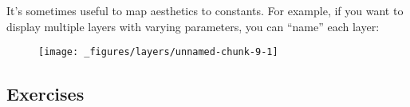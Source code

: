 It's sometimes useful to map aesthetics to constants. For example, if
you want to display multiple layers with varying parameters, you can
``name'' each layer:

\begin{Shaded}
\begin{Highlighting}[]
\OperatorTok{+}\StringTok{ }
\StringTok{  }\NormalTok{() }\OperatorTok{+}
\StringTok{  }\NormalTok{(}\NormalTok{(} \NormalTok{), } \NormalTok{, } \NormalTok{) }\OperatorTok{+}\StringTok{ }
\StringTok{  }\NormalTok{(}\NormalTok{(} \NormalTok{), } \NormalTok{, } \NormalTok{) }\OperatorTok{+}
\StringTok{  }\NormalTok{(} \NormalTok{)}
\end{Highlighting}
\end{Shaded}

\begin{figure}[H]
  \centering
  \texttt{[image: \_figures/layers/unnamed-chunk-9-1]}
\end{figure}

\hypertarget{exercises-1}{%
\subsection{Exercises}\label{exercises-1}}

